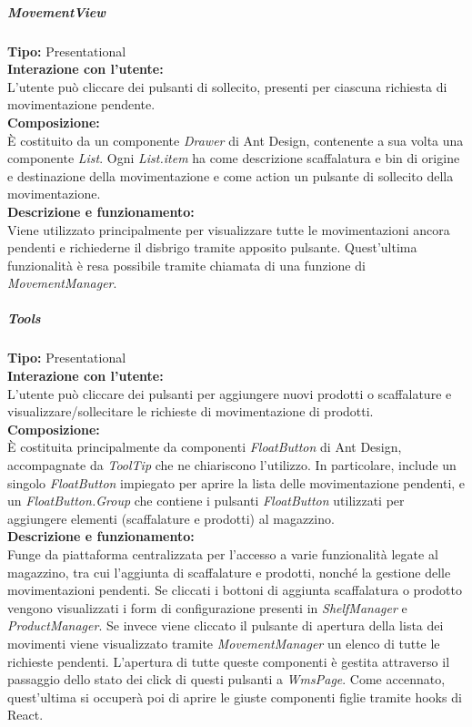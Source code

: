 \subparagraph{\colorbox{verde_uml}{MovementView}}
\textbf{Tipo:} Presentational \\
\textbf{Interazione con l'utente:} \\
L'utente può cliccare dei pulsanti di sollecito, presenti per ciascuna richiesta di movimentazione pendente.\\
\textbf{Composizione:} \\
È costituito da un componente \textit{Drawer} di Ant Design, contenente a sua volta una componente \textit{List}. Ogni \textit{List.item} ha come descrizione scaffalatura e bin di origine e destinazione della movimentazione e come action un pulsante di sollecito della movimentazione.\\
\textbf{Descrizione e funzionamento:} \\
Viene utilizzato principalmente per visualizzare tutte le movimentazioni ancora pendenti e richiederne il disbrigo tramite apposito pulsante. Quest'ultima funzionalità è resa possibile tramite chiamata di una funzione di \textit{MovementManager}. 

\subparagraph{\colorbox{verde_uml}{Tools}}
\textbf{Tipo:} Presentational \\
\textbf{Interazione con l'utente:} \\
L'utente può cliccare dei pulsanti per aggiungere nuovi prodotti o scaffalature e visualizzare/sollecitare le richieste di movimentazione di prodotti.
\\
\textbf{Composizione:} \\
È costituita principalmente da componenti \textit{FloatButton} di Ant Design, accompagnate da \textit{ToolTip} che ne chiariscono l'utilizzo. In particolare, include un singolo \textit{FloatButton} impiegato per aprire la lista delle movimentazione pendenti, e un \textit{FloatButton.Group} che contiene i pulsanti \textit{FloatButton} utilizzati per aggiungere elementi (scaffalature e prodotti) al magazzino.\\
\textbf{Descrizione e funzionamento:} \\
Funge da piattaforma centralizzata per l'accesso a varie funzionalità legate al magazzino, tra cui l'aggiunta di scaffalature e prodotti, nonché la gestione delle movimentazioni pendenti.
Se cliccati i bottoni di aggiunta scaffalatura o prodotto vengono visualizzati i form di configurazione presenti in \textit{ShelfManager} e \textit{ProductManager}. Se invece viene cliccato il pulsante di apertura della lista dei movimenti viene visualizzato tramite \textit{MovementManager} un elenco di tutte le richieste pendenti. L'apertura di tutte queste componenti è gestita attraverso il passaggio dello stato dei click di questi pulsanti a \textit{WmsPage}. Come accennato, quest'ultima si occuperà poi di aprire le giuste componenti figlie tramite hooks di React. 

